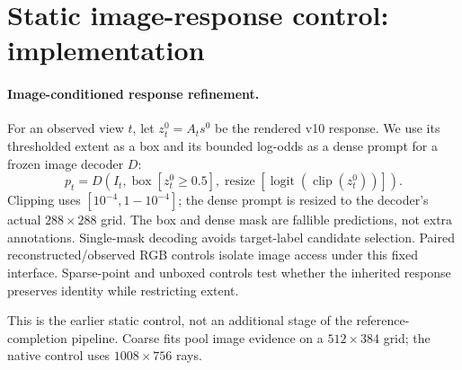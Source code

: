 \section{Static image-response control: implementation}
\paragraph{Image-conditioned response refinement.}
For an observed view $t$, let $z_t^0=A_t s^0$ be the rendered v10 response.
We use its thresholded extent as a box and its bounded log-odds as a dense
prompt for a frozen image decoder $D$:
\begin{equation}
 p_t=D(I_t,\operatorname{box}[z_t^0\geq0.5],
       \operatorname{resize}[\operatorname{logit}(\operatorname{clip}(z_t^0))]).
\end{equation}
Clipping uses $[10^{-4},1-10^{-4}]$; the dense prompt is resized to the
decoder's actual $288\times288$ grid. The box and dense mask are fallible
predictions, not extra annotations. Single-mask decoding avoids target-label
candidate selection. Paired reconstructed/observed RGB controls isolate image
access under this fixed interface. Sparse-point and unboxed controls test
whether the inherited response preserves identity while restricting extent.


This is the earlier static control, not an additional stage of the
reference-completion pipeline. Coarse fits pool image evidence on a
$512\times384$ grid; the native control uses $1008\times756$ rays.
